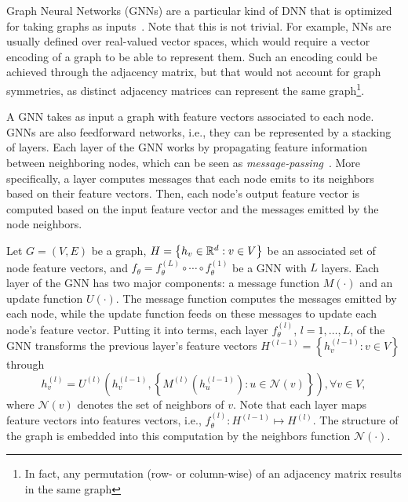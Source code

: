 Graph Neural Networks (GNNs) are a particular kind of DNN that is optimized for taking graphs as inputs~\cite{sanchez-lengelingGentleIntroductionGraph2021}.
Note that this is not trivial.
For example, NNs are usually defined over real-valued vector spaces, which would require a vector encoding of a graph to be able to represent them.
Such an encoding could be achieved through the adjacency matrix, but that would not account for graph symmetries, as distinct adjacency matrices can represent the same graph\footnote{In fact, any permutation (row- or column-wise) of an adjacency matrix results in the same graph}.

A GNN takes as input a graph with feature vectors associated to each node.
GNNs are also feedforward networks, i.e., they can be represented by a stacking of layers.
Each layer of the GNN works by propagating feature information between neighboring nodes, which can be seen as \emph{message-passing}~\cite{gilmerNeuralMessagePassing2017}.
More specifically, a layer computes messages that each node emits to its neighbors based on their feature vectors.
Then, each node's output feature vector is computed based on the input feature vector and the messages emitted by the node neighbors.

Let $G=(V,E)$ be a graph, $H =\left\{ h_v\in \mathbb{R}^{d}: v\in V \right\} $ be an associated set of node feature vectors, and $f_\theta = f_\theta^{(L)} \circ \cdots \circ f_\theta^{(1)}$ be a GNN with $L$ layers.
Each layer of the GNN has two major components: a message function $M(\cdot)$ and an update function $U(\cdot)$.
The message function computes the messages emitted by each node, while the update function feeds on these messages to update each node's feature vector.
Putting it into terms, each layer $f^{(l)}_\theta$, $l=1,\ldots,L$, of the GNN transforms the previous layer's feature vectors $H^{(l-1)}=\left\{ h^{(l-1)}_v : v \in V \right\}$ through 
\[
     h^{(l)}_v = U^{(l)}\left( h^{(l-1)}_v , \left\{ M^{(l)}(h^{(l-1)}_u):u\in \mathcal{N}(v) \right\}  \right) , \forall v \in V
,\] where $\mathcal{N}(v)$ denotes the set of neighbors of $v$.
Note that each layer maps feature vectors into features vectors, i.e., $f_\theta^{(l)}: H^{(l-1)} \mapsto H^{(l)}$.
The structure of the graph is embedded into this computation by the neighbors function $\mathcal{N}(\cdot)$.


